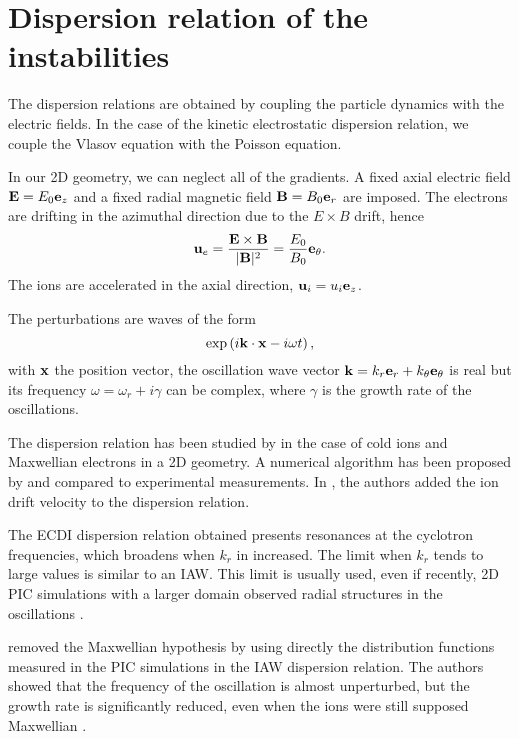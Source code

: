 
\section{Dispersion relation of the instabilities}
  \label{sec-DR-kinetic}
  
  
  The dispersion relations are obtained by coupling the particle dynamics with the electric fields.
  In the case of the kinetic electrostatic dispersion relation, we couple the Vlasov equation with the Poisson equation.
  
  In our \ac{2D} geometry, we can neglect all of the gradients.
  A fixed axial electric field ${\mathbf E} = E_0 {\mathbf e_z}$ and a fixed radial magnetic field ${\mathbf B} = B_0 {\mathbf e_r}$ are imposed.
  The electrons are drifting in the azimuthal direction due to the $E\times B$ drift, hence
  \[ {\mathbf u_{e}} = \frac{{\mathbf E} \times {\mathbf B}}{\lvert{\mathbf B}\rvert^2} = \frac{E_0}{B_0}  {\mathbf e_{\theta}}.    \]
  The ions are accelerated in the axial direction, $ {\mathbf u_i} = u_i  {\mathbf e_z}$.
  
  The perturbations are waves of the form \[ \exp \left( i {\mathbf k} \cdot {\mathbf x} - i \omega t  \right), \]
  with ${\mathbf x}$ the position vector, the oscillation wave vector ${\mathbf k} = k_r {\mathbf e_r} + k_{\theta} {\mathbf e_{\theta}}$ is real but its frequency $\omega = \omega_r + i \gamma$ can be complex, where $\gamma$ is the growth rate of the oscillations. 
  
  \vspace{1em}
  The dispersion relation has been studied by \citet{ducrocq2006} in the case of cold ions and Maxwellian electrons in a \ac{2D} geometry.
  A numerical algorithm has been proposed by \citet{cavalier2013} and compared to experimental measurements.
  In \citet{lafleur2016}, the authors added the ion drift velocity to the dispersion relation.
  
  The \ac{ECDI} dispersion relation obtained presents resonances at the cyclotron frequencies, which broadens when $k_r$ in increased.
  The limit when $k_r$ tends to large values is similar to an \ac{IAW}.
  This limit is usually used, even if recently, \ac{2D} \ac{PIC} simulations with a larger domain observed radial structures in the oscillations \citep{janhunen2018,hara2019a}.
  
  \citet{lafleur2018} removed the Maxwellian hypothesis by using directly the distribution functions measured in the \ac{PIC} simulations in the \ac{IAW} dispersion relation.
  The authors showed that the frequency of the oscillation is almost unperturbed, but the growth rate is significantly reduced, even when the ions were still supposed Maxwellian \citep[Fig. 8]{lafleur2018}.
  
